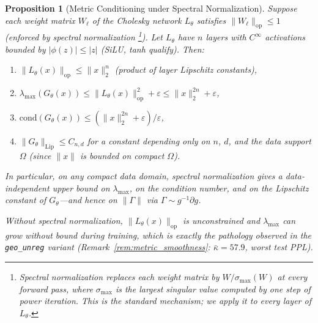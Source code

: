 \documentclass[11pt,a4paper]{article}
\newtheorem{proposition}[theorem]{Proposition}
\theoremstyle{definition}
\theoremstyle{remark}
\begin{document}
\begin{proposition}[Metric Conditioning under Spectral Normalization]%
\label{prop:metric_cond}
Suppose each weight matrix $W_\ell$ of the Cholesky network 
$L_\theta$ satisfies $\|W_\ell\|_{\mathrm{op}} \leq 1$ 
(enforced by spectral normalization 
\cite{miyato2018spectral}\footnote{Spectral normalization 
replaces each weight matrix by $W / \sigma_{\max}(W)$ at every 
forward pass, where $\sigma_{\max}$ is the largest singular 
value computed by one step of power iteration. This is the 
standard mechanism; we apply it to every layer of $L_\theta$.}). 
Let $L_\theta$ have $n$ layers with $C^\infty$ activations 
bounded by $|\phi(z)| \leq |z|$ (SiLU, tanh qualify). Then:
\begin{enumerate}[nosep,label=(\roman*)]
  \item $\|L_\theta(x)\|_{\mathrm{op}} \leq \|x\|_2^n$ 
  (product of layer Lipschitz constants),
  \item $\lambda_{\max}(G_\theta(x)) \leq 
  \|L_\theta(x)\|_{\mathrm{op}}^2 + \varepsilon 
  \leq \|x\|_2^{2n} + \varepsilon$,
  \item $\mathrm{cond}(G_\theta(x)) \leq 
  (\|x\|_2^{2n} + \varepsilon) / \varepsilon$,
  \item $\|G_\theta\|_{\mathrm{Lip}} \leq C_{n,d}$ for a 
  constant depending only on $n$, $d$, and the data support 
  $\Omega$ (since $\|x\|$ is bounded on compact $\Omega$).
\end{enumerate}
In particular, on any compact data domain, spectral normalization 
gives a data-independent upper bound on $\lambda_{\max}$, on the 
condition number, and on the Lipschitz constant of $G_\theta$---and 
hence on $\|\Gamma\|$ via $\Gamma \sim g^{-1} \partial g$.

Without spectral normalization, $\|L_\theta(x)\|_{\mathrm{op}}$ 
is unconstrained and $\lambda_{\max}$ can grow without bound 
during training, which is exactly the pathology observed in the 
\texttt{geo\_unreg} variant 
(Remark~\ref{rem:metric_smoothness}: $\bar\kappa = 57.9$, 
worst test PPL).
\end{proposition}
\end{document}
